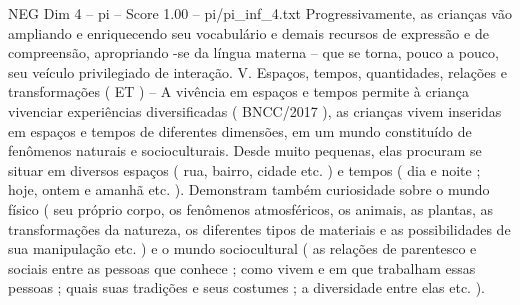 \begin{textsample}{NEG Dim 4 – pi – Score 1.00 – pi/pi\_inf\_4.txt}
Progressivamente, as crianças vão ampliando e enriquecendo seu vocabulário e demais recursos de expressão e de compreensão, apropriando -se da língua materna – que se torna, pouco a pouco, seu veículo privilegiado de interação.
V.
Espaços, tempos, quantidades, relações e transformações ( ET ) – A vivência em espaços e tempos permite à criança vivenciar experiências diversificadas ( BNCC/2017 ), as crianças vivem inseridas em espaços e tempos de diferentes dimensões, em um mundo constituído de fenômenos naturais e socioculturais.
Desde muito pequenas, elas procuram se situar em diversos espaços ( rua, bairro, cidade etc. ) e tempos ( dia e noite ; hoje, ontem e amanhã etc. ).
Demonstram também curiosidade sobre o mundo físico ( seu próprio corpo, os fenômenos atmosféricos, os animais, as plantas, as transformações da natureza, os diferentes tipos de materiais e as possibilidades de sua manipulação etc. ) e o mundo sociocultural ( as relações de parentesco e sociais entre as pessoas que conhece ; como vivem e em que trabalham essas pessoas ; quais suas tradições e seus costumes ; a diversidade entre elas etc. ).

\end{textsample}
